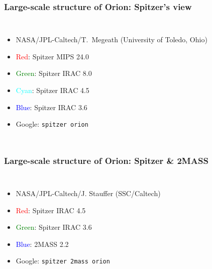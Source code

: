 \documentclass[presentation]{beamer}
\begin{document}
\begin{frame}
  \frametitle{Large-scale structure of Orion: Spitzer's view}
  \begin{columns}
    \begin{itemize}
    \item NASA/JPL-Caltech/T.~Megeath (University of Toledo, Ohio)
    \item<alert@2> \textcolor{red}{Red}: Spitzer MIPS \SI{24.0}{\micron}
    \item<alert@3> \textcolor{green}{Green}: Spitzer IRAC \SI{8.0}{\micron} 
    \item<alert@3,4> \textcolor{cyan}{Cyan}: Spitzer IRAC \SI{4.5}{\micron} 
    \item<alert@4> \textcolor{blue}{Blue}: Spitzer IRAC \SI{3.6}{\micron} 
    \item Google: \texttt{spitzer orion} 
    \end{itemize}
  \end{columns}
\end{frame}

\begin{frame}
  \frametitle{Large-scale structure of Orion: Spitzer \& 2MASS}
  \begin{columns}
    \begin{itemize}
    \item NASA/JPL-Caltech/J. Stauffer (SSC/Caltech)
    \item<alert@2> \textcolor{red}{Red}: Spitzer IRAC \SI{4.5}{\micron}
    \item<alert@3> \textcolor{green}{Green}: Spitzer IRAC \SI{3.6}{\micron} 
    \item<alert@4> \textcolor{blue}{Blue}: 2MASS \SI{2.2}{\micron} 
    \item Google: \texttt{spitzer 2mass orion} 
    \end{itemize}
  \end{columns}
\end{frame}
\end{document}
